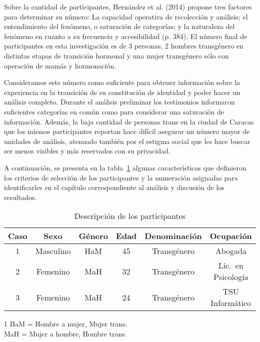 Sobre la cantidad de participantes, Hernández et al. (2014) propone tres
factores para determinar su número: La capacidad operativa de recolección y
análisis; el entendimiento del fenómeno, o saturación de categorías; y la
naturaleza del fenómeno en cuanto a su frecuencia y accesibilidad (p. 384).
El número final de participantes en esta investigación es de 3 personas, 2
hombres transgénero en distintas etapas de transición hormonal y una mujer
transgénero sólo con operación de mamás y hormonación.

Consideramos este número como suficiente para obtener información sobre la
experiencia en la transición de su constitución de identidad y poder hacer un
análisis completo.
Durante el análisis preliminar los testimonios informaron
suficientes categorías en común como para considerar una saturación de
información.
Además, la baja cantidad de personas trans en la ciudad de Caracas
que los mismos participantes reportan hace difícil asegurar un número mayor de
unidades de análisis, atenuado también por el estigma social que les hace buscar
ser menos visibles y más reservados con su privacidad.

A continuación, se presenta en la tabla~\ref{tab:participantes} algunas
características que definieron los criterios de selección de los
participantes y la numeración asignadas para identificarles en el capítulo
correspondiente al análisis y discusión de los resultados.

\begin{table}[]
  \caption{Descripción de los participantes}\label{tab:participantes}
  \centering
  \begin{threeparttable}
    \renewcommand{\tabcolsep}{1pt}
    \begin{tabularx}{0.8\textwidth}{@{}cccccc@{}}
    \toprule
    Caso & Sexo & Género\tnote{1}       & Edad & Denominación & Ocupación
    \\ \midrule
    1            & Masculino      & HaM & 45   & Transgénero      & Abogada            \\
    2            & Femenino       & MaH & 32   & Transgénero      & Lic.\ en Psicología \\
    3            & Femenino       & MaH & 24   & Transgénero      & TSU Informático    \\ \bottomrule
    \end{tabularx}
    \begin{tablenotes}
      \footnotesize
    \item[1] HaM = Hombre a mujer, Mujer trans.\\MaH = Mujer a hombre, Hombre trans.
    \end{tablenotes}
  \end{threeparttable}
\end{table}

